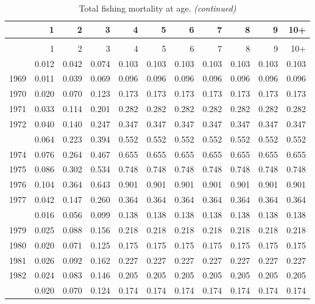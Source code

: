 \documentclass[
]{article}
\begin{document}
\begin{longtable}[t]{lrrrrrrrrrr}
\caption{\label{tab:FAA-tot-table}Total fishing mortality at age.}\\
\toprule
  & 1 & 2 & 3 & 4 & 5 & 6 & 7 & 8 & 9 & 10+\\
\midrule
\endfirsthead
\caption[]{Total fishing mortality at age. \textit{(continued)}}\\
\toprule
  & 1 & 2 & 3 & 4 & 5 & 6 & 7 & 8 & 9 & 10+\\
\midrule
\endhead

\endfoot
\bottomrule
\endlastfoot
1968 & 0.012 & 0.042 & 0.074 & 0.103 & 0.103 & 0.103 & 0.103 & 0.103 & 0.103 & 0.103\\
1969 & 0.011 & 0.039 & 0.069 & 0.096 & 0.096 & 0.096 & 0.096 & 0.096 & 0.096 & 0.096\\
1970 & 0.020 & 0.070 & 0.123 & 0.173 & 0.173 & 0.173 & 0.173 & 0.173 & 0.173 & 0.173\\
1971 & 0.033 & 0.114 & 0.201 & 0.282 & 0.282 & 0.282 & 0.282 & 0.282 & 0.282 & 0.282\\
1972 & 0.040 & 0.140 & 0.247 & 0.347 & 0.347 & 0.347 & 0.347 & 0.347 & 0.347 & 0.347\\
\addlinespace
1973 & 0.064 & 0.223 & 0.394 & 0.552 & 0.552 & 0.552 & 0.552 & 0.552 & 0.552 & 0.552\\
1974 & 0.076 & 0.264 & 0.467 & 0.655 & 0.655 & 0.655 & 0.655 & 0.655 & 0.655 & 0.655\\
1975 & 0.086 & 0.302 & 0.534 & 0.748 & 0.748 & 0.748 & 0.748 & 0.748 & 0.748 & 0.748\\
1976 & 0.104 & 0.364 & 0.643 & 0.901 & 0.901 & 0.901 & 0.901 & 0.901 & 0.901 & 0.901\\
1977 & 0.042 & 0.147 & 0.260 & 0.364 & 0.364 & 0.364 & 0.364 & 0.364 & 0.364 & 0.364\\
\addlinespace
1978 & 0.016 & 0.056 & 0.099 & 0.138 & 0.138 & 0.138 & 0.138 & 0.138 & 0.138 & 0.138\\
1979 & 0.025 & 0.088 & 0.156 & 0.218 & 0.218 & 0.218 & 0.218 & 0.218 & 0.218 & 0.218\\
1980 & 0.020 & 0.071 & 0.125 & 0.175 & 0.175 & 0.175 & 0.175 & 0.175 & 0.175 & 0.175\\
1981 & 0.026 & 0.092 & 0.162 & 0.227 & 0.227 & 0.227 & 0.227 & 0.227 & 0.227 & 0.227\\
1982 & 0.024 & 0.083 & 0.146 & 0.205 & 0.205 & 0.205 & 0.205 & 0.205 & 0.205 & 0.205\\
\addlinespace
1983 & 0.020 & 0.070 & 0.124 & 0.174 & 0.174 & 0.174 & 0.174 & 0.174 & 0.174 & 0.174\\

\end{longtable}
\end{document}
